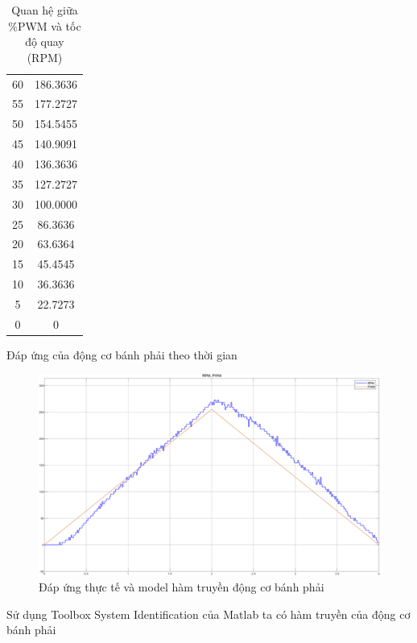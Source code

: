 \begin{table}[h!]
\begin{tabular}{|c|c|}
                         60 & 186.3636 \\
                         55 & 177.2727 \\
                         50 & 154.5455 \\
                         45 & 140.9091 \\
                         40 & 136.3636 \\
                         35 & 127.2727 \\
                         30 & 100.0000 \\
                         25 & 86.3636 \\
                         20 & 63.6364 \\
                         15 & 45.4545 \\
                         10 & 36.3636 \\
                         5 & 22.7273 \\
                         0 & 0 \\
                         \hline
                    \end{tabular}
                    \caption{Quan hệ giữa \%PWM và tốc độ quay (RPM)}
               \end{table}
               \newpage
               \hspace*{0.6cm}Đáp ứng của động cơ bánh phải theo thời gian
               \begin{figure}[H]
                    \centering
                    \includegraphics[width=1\textwidth]{pictures/chapter5/CJGB1_response.png}
                    \caption{Đáp ứng thực tế và model hàm truyền động cơ bánh phải}
                    \label{CJGB1_response}
               \end{figure}  
               \hspace*{0.6cm}Sử dụng Toolbox System Identification của Matlab ta có hàm truyền của động cơ bánh phải 
